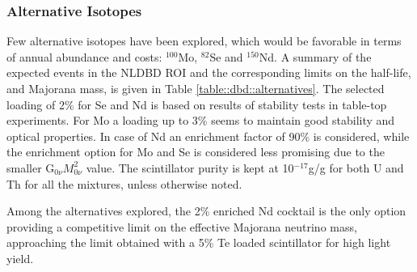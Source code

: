 \noindent

\subsubsection{Alternative Isotopes}

Few alternative isotopes have been explored, which would be favorable in terms of annual abundance and costs: $^{100}$Mo, $^{82}$Se and $^{150}$Nd. A summary of the expected events in the NLDBD ROI and the corresponding limits on the half-life, and Majorana mass, is given in Table \ref{table::dbd::alternatives}. The selected loading of 2\% for Se and Nd is based on results of stability tests in table-top experiments. For Mo a loading up to 3\% seems to maintain good stability and optical properties. In case of Nd an enrichment factor of 90\% is considered, while the enrichment option for Mo and Se is considered less promising due to the smaller G$_{0\nu} M^{2}_{0\nu}$ value. The scintillator purity is kept at 10$^{-17}$g/g for both U and Th for all the mixtures, unless otherwise noted.

Among the alternatives explored, the 2\% enriched Nd cocktail is the only option providing a competitive limit on the effective Majorana neutrino mass, approaching the limit obtained with a 5\% Te loaded scintillator for high light yield.

